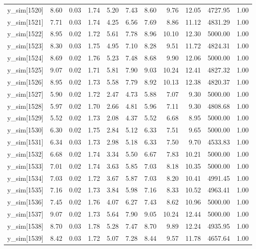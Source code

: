 \begin{table}[ht]
\begin{tabular}{rrrrrrrrrrr}
  y\_sim[1520] & 8.60 & 0.03 & 1.74 & 5.20 & 7.43 & 8.60 & 9.76 & 12.05 & 4727.95 & 1.00 \\ 
  y\_sim[1521] & 7.71 & 0.03 & 1.74 & 4.25 & 6.56 & 7.69 & 8.86 & 11.12 & 4831.29 & 1.00 \\ 
  y\_sim[1522] & 8.95 & 0.02 & 1.72 & 5.61 & 7.78 & 8.96 & 10.10 & 12.30 & 5000.00 & 1.00 \\ 
  y\_sim[1523] & 8.30 & 0.03 & 1.75 & 4.95 & 7.10 & 8.28 & 9.51 & 11.72 & 4824.31 & 1.00 \\ 
  y\_sim[1524] & 8.69 & 0.02 & 1.76 & 5.23 & 7.48 & 8.68 & 9.90 & 12.06 & 5000.00 & 1.00 \\ 
  y\_sim[1525] & 9.07 & 0.02 & 1.71 & 5.81 & 7.90 & 9.03 & 10.24 & 12.41 & 4827.32 & 1.00 \\ 
  y\_sim[1526] & 8.95 & 0.02 & 1.73 & 5.58 & 7.79 & 8.92 & 10.13 & 12.38 & 4820.37 & 1.00 \\ 
  y\_sim[1527] & 5.90 & 0.02 & 1.72 & 2.47 & 4.73 & 5.88 & 7.07 & 9.30 & 5000.00 & 1.00 \\ 
  y\_sim[1528] & 5.97 & 0.02 & 1.70 & 2.66 & 4.81 & 5.96 & 7.11 & 9.30 & 4808.68 & 1.00 \\ 
  y\_sim[1529] & 5.52 & 0.02 & 1.73 & 2.08 & 4.37 & 5.52 & 6.68 & 8.95 & 5000.00 & 1.00 \\ 
  y\_sim[1530] & 6.30 & 0.02 & 1.75 & 2.84 & 5.12 & 6.33 & 7.51 & 9.65 & 5000.00 & 1.00 \\ 
  y\_sim[1531] & 6.34 & 0.03 & 1.73 & 2.98 & 5.18 & 6.33 & 7.50 & 9.70 & 4533.83 & 1.00 \\ 
  y\_sim[1532] & 6.68 & 0.02 & 1.74 & 3.34 & 5.50 & 6.67 & 7.83 & 10.21 & 5000.00 & 1.00 \\ 
  y\_sim[1533] & 7.01 & 0.02 & 1.74 & 3.63 & 5.85 & 7.03 & 8.18 & 10.35 & 5000.00 & 1.00 \\ 
  y\_sim[1534] & 7.03 & 0.02 & 1.72 & 3.67 & 5.87 & 7.03 & 8.20 & 10.41 & 4991.45 & 1.00 \\ 
  y\_sim[1535] & 7.16 & 0.02 & 1.73 & 3.84 & 5.98 & 7.16 & 8.33 & 10.52 & 4963.41 & 1.00 \\ 
  y\_sim[1536] & 7.45 & 0.02 & 1.76 & 4.07 & 6.27 & 7.43 & 8.62 & 10.96 & 5000.00 & 1.00 \\ 
  y\_sim[1537] & 9.07 & 0.02 & 1.73 & 5.64 & 7.90 & 9.05 & 10.24 & 12.44 & 5000.00 & 1.00 \\ 
  y\_sim[1538] & 8.70 & 0.03 & 1.78 & 5.28 & 7.47 & 8.70 & 9.89 & 12.24 & 4935.95 & 1.00 \\ 
  y\_sim[1539] & 8.42 & 0.03 & 1.72 & 5.07 & 7.28 & 8.44 & 9.57 & 11.78 & 4657.64 & 1.00 \\ 

\end{tabular}
\end{table}
